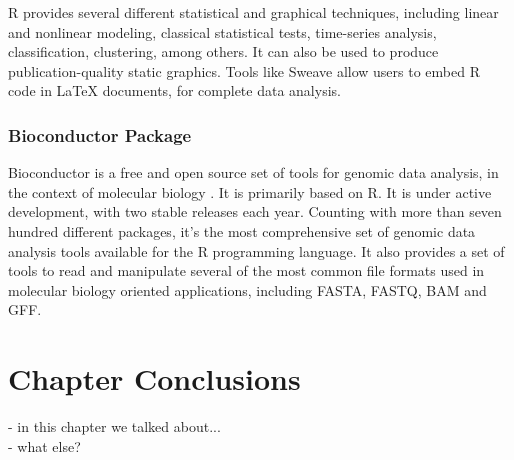 R provides several different statistical and graphical techniques, including
linear and nonlinear modeling, classical statistical tests, time-series
analysis, classification, clustering, among others. It can also be used to
produce publication-quality static graphics. Tools like Sweave
\cite{lmucs-papers:Leisch:2002} allow users to embed R code in \LaTeX{}
documents, for complete data analysis.

\subsubsection*{Bioconductor Package}

Bioconductor is a free and open source set of tools for genomic data analysis,
in the context of molecular biology \cite{lmucs-papers:Leisch:2002}. It is
primarily based on R. It is under active development, with two stable releases
each year. Counting with more than seven hundred different packages, it's the
most comprehensive set of genomic data analysis tools available for the R
programming language. It also provides a set of tools to read and manipulate
several of the most common file formats used in molecular biology oriented
applications, including FASTA, FASTQ, BAM and GFF.

\section{Chapter Conclusions}

- in this chapter we talked about...\\
- what else?\\
